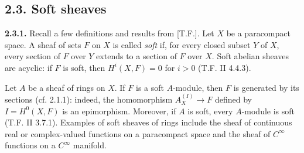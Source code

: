 \subsection*{2.3. Soft sheaves}

\textbf{2.3.1.} Recall a few definitions and results from [T.F.]. Let $X$ be a paracompact space. A sheaf of sets $F$ on $X$ is called \emph{soft} if, for every closed subset $Y$ of $X$, every section of $F$ over $Y$ extends to a section of $F$ over $X$. Soft abelian sheaves are acyclic: if $F$ is soft, then $H^i(X,F)=0$ for $i>0$ (T.F. II 4.4.3).

Let $A$ be a sheaf of rings on $X$. If $F$ is a soft $A$-module, then $F$ is generated by its sections (cf. 2.1.1): indeed, the homomorphism $A_X^{(I)}\to F$ defined by $I=H^0(X,F)$ is an epimorphism. Moreover, if $A$ is soft, every $A$-module is soft (T.F. II 3.7.1). Examples of soft sheaves of rings include the sheaf of continuous real or complex-valued functions on a paracompact space and the sheaf of $C^\infty$ functions on a $C^\infty$ manifold.

